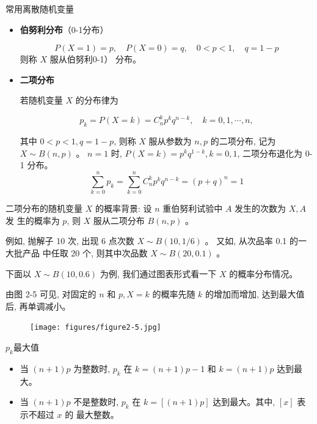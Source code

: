 \documentclass{beamer}
\begin{document}
	\begin{frame}
		常用离散随机变量
		\begin{itemize}
			\item \textbf{伯努利分布}（0-1分布）
			
			$$
			P(X=1)=p, \quad P(X=0)=q, \quad 0<p<1, \quad q=1-p
			$$
			则称 $X$ 服从伯努利0-1） 分布。
			\item \textbf{二项分布}
			
			
			若随机变量 $X$ 的分布律为
			
			$$
			p_{k}=P(X=k)=C_{n}^{k} p^{k} q^{n-k}, \quad k=0,1, \cdots, n,
			$$
			
			其中 $0<p<1, q=1-p$, 则称 $X$ 服从参数为 $n, p$ 的二项分布, 记为 $X \sim B(n, p)$ 。 $n=1$ 时, $P(X=k)=p^{k} q^{1-k}, k=0,1$, 二项分布退化为 0-1 分布。$$
			\sum_{k=0}^{n} p_{k}=\sum_{k=0}^{n} C_{n}^{k} p^{k} q^{n-k}=(p+q)^{n}=1
			$$
		\end{itemize}
	\end{frame}
	
	\begin{frame}
		二项分布的随机变量 $X$ 的概率背景: 设 $n$ 重伯努利试验中 $A$ 发生的次数为 $X, A$ 发 生的概率为 $p$, 则 $X$ 服从二项分布 $B(n, p)$ 。
		
		例如, 抛解子 10 次, 出现 6 点次数 $X \sim B(10,1 / 6)$ 。 又如, 从次品率 0.1 的一大批产品 中任取 20 个, 则其中次品数 $X \sim B(20,0.1)$ 。
		
		下面以 $X \sim B(10,0.6)$ 为例, 我们通过图表形式看一下 $X$ 的概率分布情况。
		
		由图 2-5 可见, 对固定的 $n$ 和 $p, X=k$ 的概率先随 $k$ 的增加而增加, 达到最大值后, 再单调减小。
	\end{frame}
	
	\begin{frame}
		\begin{figure}
			\centering
			\texttt{[image: figures/figure2-5.jpg]}
		\end{figure}
	\end{frame}
	
	\begin{frame}
		$p_k$最大值
		\begin{itemize}
			\item 当 $(n+1) p$ 为整数时, $p_{k}$ 在 $k=(n+1) p-1$ 和 $k=(n+1) p$ 达到最大。
			\item 当 $(n+1) p$ 不是整数时, $p_{k}$ 在 $k=[(n+1) p]$ 达到最大。其中, $[x]$ 表示不超过 $x$ 的 最大整数。
			
		\end{itemize}
	\end{frame}
	
\end{document}
